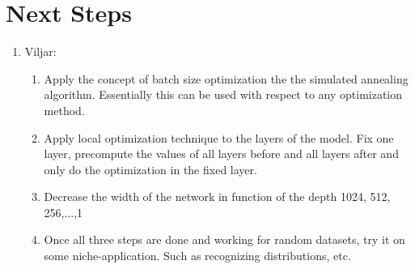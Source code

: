 \section{Next Steps}


\begin{enumerate}
 \item Viljar: 
\begin{enumerate}
    \item Apply the concept of batch size optimization the the simulated annealing algorithm. Essentially this can be used with respect to any optimization method. 
    \item Apply local optimization technique to the layers of the model. Fix one layer, precompute the values of all layers before and all layers after and only do the optimization in the fixed layer. 
    \item Decrease the width of the network in function of the depth 1024, 512, 256,...,1
    \item Once all three steps are done and working for random datasets, try it on some niche-application. Such as recognizing distributions, etc. 
\end{enumerate}
\end{enumerate}